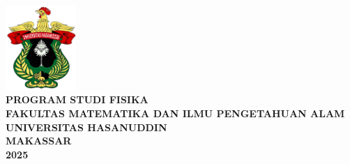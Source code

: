 \begingroup
\singlespacing
\fontsize{11pt}{13pt}\selectfont
\begin{center}
  \textbf{\JudulSkripsi} \\
  \vfill
  \textbf{\MakeTextUppercase{\NamaPenulis}} \\
  \textbf{\NIM} \\
  \vspace*{1.5cm}
  \includegraphics[height=3.2cm]{gambar/uh-fc.png} \\
  \vfill
  \textbf{PROGRAM STUDI FISIKA} \\
  \textbf{FAKULTAS MATEMATIKA DAN ILMU PENGETAHUAN ALAM} \\
  \textbf{UNIVERSITAS HASANUDDIN} \\
  \textbf{MAKASSAR} \\
  \textbf{2025}
\end{center}
\endgroup
\restoregeometry
